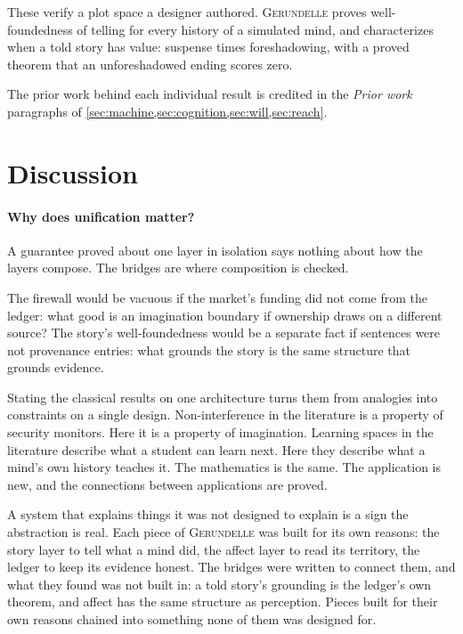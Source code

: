 \documentclass[11pt]{article}
\newcommand{\gerundelle}{\textsc{Gerundelle}}
\theoremstyle{remark}
\begin{document}
These verify a plot space a designer authored. \gerundelle{} proves well-foundedness of
telling for every history of a simulated mind, and characterizes when a told story has
value: suspense times foreshadowing, with a proved theorem that an unforeshadowed ending
scores zero.

\medskip
The prior work behind each individual result is credited in the \emph{Prior work}
paragraphs of \cref{sec:machine,sec:cognition,sec:will,sec:reach}.

\section{Discussion}
\label{sec:discussion}

\paragraph{Why does unification matter?}

A guarantee proved about one layer in isolation says nothing about how the layers compose.
The bridges are where composition is checked.

The firewall would be vacuous if the market's funding did not come from the ledger: what
good is an imagination boundary if ownership draws on a different source? The story's
well-foundedness would be a separate fact if sentences were not provenance entries: what
grounds the story is the same structure that grounds evidence.

Stating the classical results on one architecture turns them from analogies into
constraints on a single design. Non-interference in the literature is a property of
security monitors. Here it is a property of imagination. Learning spaces in the literature
describe what a student can learn next. Here they describe what a mind's own history
teaches it. The mathematics is the same. The application is new, and the connections between
applications are proved.

A system that explains things it was not designed to explain is a sign the abstraction is
real. Each piece of \gerundelle{} was built for its own reasons: the story layer to tell
what a mind did, the affect layer to read its territory, the ledger to keep its evidence
honest. The bridges were written to connect them, and what they found was not built in: a
told story's grounding is the ledger's own theorem, and affect has the same structure as
perception. Pieces built for their own reasons chained into something none of them was
designed for.
\end{document}
